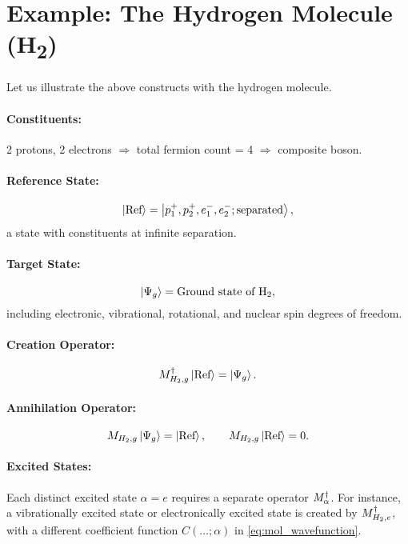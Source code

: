 \section{Example: The Hydrogen Molecule (H\textsubscript{2})}
\label{sec:mol_ops_examples}

Let us illustrate the above constructs with the hydrogen molecule.

\paragraph{Constituents:} 2 protons, 2 electrons \(\Rightarrow\) total fermion count = 4 \(\Rightarrow\) composite boson.

\paragraph{Reference State:}
\[
\ket{\text{Ref}} = \ket{p^+_1, p^+_2, e^-_1, e^-_2; \text{separated}},
\]
a state with constituents at infinite separation.

\paragraph{Target State:}
\[
\ket{\Psi_g} = \text{Ground state of H}_2,
\]
including electronic, vibrational, rotational, and nuclear spin degrees of freedom.

\paragraph{Creation Operator:}
\begin{equation}
	M^\dagger_{H_2, g} \ket{\text{Ref}} = \ket{\Psi_g}.
\end{equation}

\paragraph{Annihilation Operator:}
\begin{equation}
	M_{H_2, g} \ket{\Psi_g} = \ket{\text{Ref}},
	\qquad
	M_{H_2, g} \ket{\text{Ref}} = 0.
\end{equation}

\paragraph{Excited States:} Each distinct excited state \(\alpha = e\) requires a separate operator \(M^\dagger_{\alpha}\). For instance, a vibrationally excited state or electronically excited state is created by \(M^\dagger_{H_2, e}\), with a different coefficient function \(C(\dots; \alpha)\) in \cref{eq:mol_wavefunction}.

